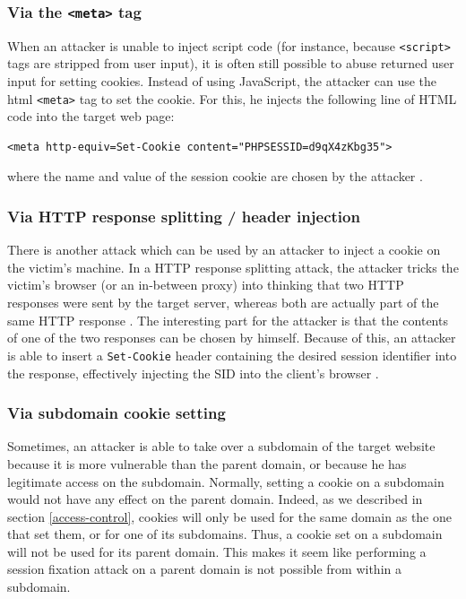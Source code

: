 \subsubsection{Via the \texttt{<meta>} tag}

When an attacker is unable to inject script code (for instance, because \texttt{<script>} tags are stripped from user input), it is often still possible to abuse returned user input for setting cookies. Instead of using JavaScript, the attacker can use the \gls{html} \texttt{<meta>} tag to set the cookie. For this, he injects the following line of HTML code into the target web page:
\begin{lstlisting}
<meta http-equiv=Set-Cookie content="PHPSESSID=d9qX4zKbg35">
\end{lstlisting}
where the name and value of the session cookie are chosen by the attacker \cite{Kolsek2002}.

\subsubsection{Via HTTP response splitting / header injection}

There is another attack which can be used by an attacker to inject a cookie on the victim's machine. In a HTTP response splitting attack, the attacker tricks the victim's browser (or an in-between proxy) into thinking that two HTTP responses were sent by the target server, whereas both are actually part of the same HTTP response \cite{Klein2004}. The interesting part for the attacker is that the contents of one of the two responses can be chosen by himself. Because of this, an attacker is able to insert a \texttt{Set-Cookie} header containing the desired session identifier into the response, effectively injecting the SID into the client's browser \cite{Johns2011}.

\subsubsection{Via subdomain cookie setting}

Sometimes, an attacker is able to take over a subdomain of the target website because it is more vulnerable than the parent domain, or because he has legitimate access on the subdomain. Normally, setting a cookie on a subdomain would not have any effect on the parent domain. Indeed, as we described in section \ref{access-control}, cookies will only be used for the same domain as the one that set them, or for one of its subdomains. Thus, a cookie set on a subdomain will not be used for its parent domain. This makes it seem like performing a session fixation attack on a parent domain is not possible from within a subdomain.

